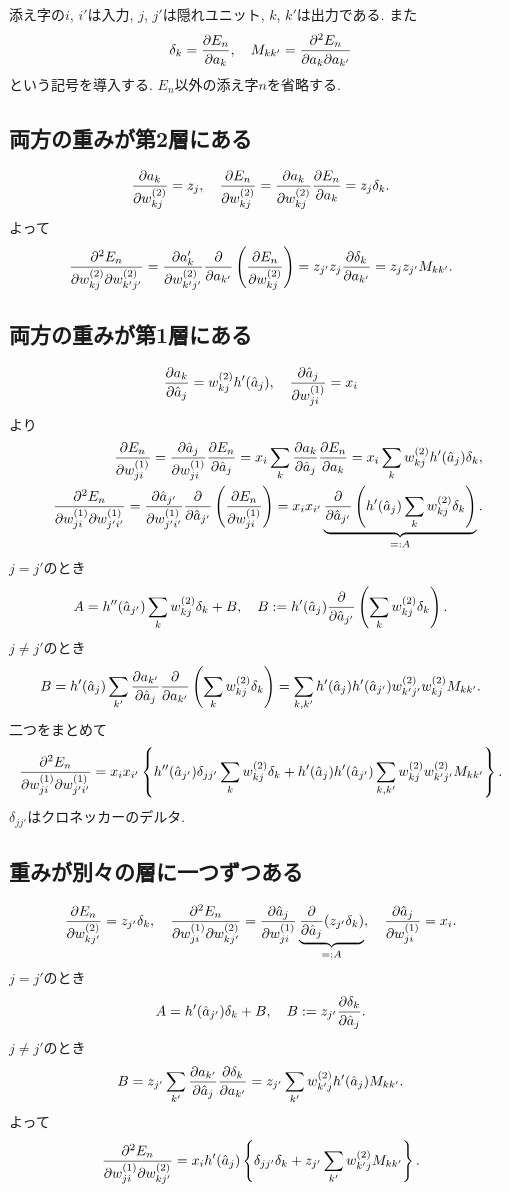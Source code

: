 添え字の$i$, $i'$は入力, $j$, $j'$は隠れユニット, $k$, $k'$は出力である.
また
$$
\delta_k=\diff{a_k}{E_n}, \quad M_{kk'}=\ddiff{a_k}{a_{k'}}{E_n}
$$
という記号を導入する.
$E_n$以外の添え字$n$を省略する.

\subsection{両方の重みが第2層にある}
$$
\diff{\ww{kj}{2}}{a_k}=z_j, \quad \diff{\ww{kj}{2}}{E_n}=\diff{\ww{kj}{2}}{a_k}\diff{a_k}{E_n}=z_j \delta_k.
$$
よって
$$
\ddiff{\ww{kj}{2}}{\ww{k'j'}{2}}{E_n}=\diff{\ww{k'j'}{2}}{a_k'}\dif{a_{k'}}\left(\diff{\ww{kj}{2}}{E_n}\right)=z_{j'}z_j \diff{a_{k'}}{\delta_k}=z_j z_{j'} M_{kk'}.
$$
\vspace{0pt}

\subsection{両方の重みが第1層にある}
$$
\diff{\hat{a}_j}{a_k}=\ww{kj}{2}h'(\hat{a}_j), \quad \diff{\ww{ji}{1}}{\hat{a}_j}=x_i
$$
より
\begin{eqnarray*}&&
\diff{\ww{ji}{1}}{E_n}=\diff{\ww{ji}{1}}{\hat{a}_j}\diff{\hat{a}_j}{E_n}=x_i\sum_k \diff{\hat{a}_j}{a_k}\diff{a_k}{E_n}=x_i\sum_k \ww{kj}{2}h'(\hat{a}_j)\delta_k,
\\&&
\ddiff{\ww{ji}{1}}{\ww{j'i'}{1}}{E_n}=\diff{\ww{j'i'}{1}}{\hat{a}_{j'}}\dif{\hat{a}_{j'}}\left(\diff{\ww{ji}{1}}{E_n}\right)=x_i x_{i'}\underbrace{\dif{\hat{a}_{j'}}\left(h'(\hat{a}_j)\sum_k \ww{kj}{2}\delta_k \right)}_{=:A}.
\end{eqnarray*}
$j=j'$のとき
$$
A=h''(\hat{a}_{j'})\sum_k \ww{kj}{2}\delta_k + B, \quad B:=h'(\hat{a}_j)\dif{\hat{a}_{j'}}\left(\sum_k \ww{kj}{2}\delta_k\right).
$$
$j\ne j'$のとき
$$
B= h'(\hat{a}_j) \sum_{k'} \diff{\hat{a}_j}{a_{k'}}\dif{a_{k'}}\left(\sum_k \ww{kj}{2}\delta_k\right)
 = \sum_{k,k'} h'(\hat{a}_j)h'(\hat{a}_{j'})\ww{k'j'}{2}\ww{kj}{2}M_{kk'}.
$$
二つをまとめて
$$
\ddiff{\ww{ji}{1}}{\ww{j'i'}{1}}{E_n}=x_i x_{i'}\left\{h''(\hat{a}_{j'})\delta_{jj'}\sum_k \ww{kj}{2}\delta_k+h'(\hat{a}_j)h'(\hat{a}_{j'})\sum_{k,k'}\ww{kj}{2}\ww{k'j'}{2}M_{kk'}\right\}.
$$
$\delta_{jj'}$はクロネッカーのデルタ.

\subsection{重みが別々の層に一つずつある}
$$
\diff{\ww{kj'}{2}}{E_n}=z_{j'}\delta_k, \quad \ddiff{\ww{ji}{1}}{\ww{kj'}{2}}{E_n}=\diff{\ww{ji}{1}}{\hat{a}_j} \underbrace{\dif{\hat{a}_j}(z_{j'}\delta_k)}_{=:A}, \quad \diff{\ww{ji}{1}}{\hat{a}_j}=x_i.
$$
$j=j'$のとき
$$
A=h'(\hat{a}_{j'})\delta_k+B, \quad B:=z_{j'}\diff{\hat{a}_j}{\delta_k}.
$$
$j\ne j'$のとき
$$
B=z_{j'}\sum_{k'} \diff{\hat{a}_j}{a_{k'}}\diff{a_{k'}}{\delta_k}=z_{j'}\sum_{k'} \ww{k'j}{2}h'(\hat{a}_j)M_{kk'}.
$$
よって
$$
\ddiff{\ww{ji}{1}}{\ww{kj'}{2}}{E_n}=x_i h'(\hat{a}_j)\left\{\delta_{jj'}\delta_k+z_{j'}\sum_{k'} \ww{k'j}{2}M_{kk'}\right\}.
$$
\vspace{0pt}

